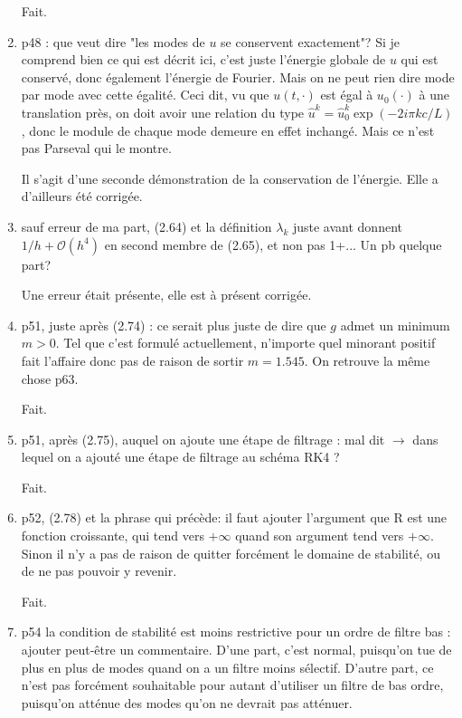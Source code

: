 \documentclass[10pt,a4paper]{article}
\begin{document}
\begin{enumerate}
{\color{blue} Fait.} 


\item p48 : que veut dire "les modes de $u$ se conservent exactement"? Si je comprend bien ce qui est décrit ici, c'est juste l'énergie globale de $u$ qui est conservé, donc également l'énergie de Fourier. Mais on ne peut rien dire mode par mode avec cette égalité. Ceci dit, vu que $u(t,\cdot)$ est égal à $u_0(\cdot)$ à une translation près, on doit avoir une relation du type $\hat{u}^k = \hat{u}^k_0 \exp (-2i \pi k c /L)$, donc le module de chaque mode demeure en effet inchangé. Mais ce n'est pas Parseval qui le montre.

{\color{blue} Il s'agit d'une seconde démonstration de la conservation de l'énergie. Elle a d'ailleurs été corrigée.} 


\item sauf erreur de ma part, (2.64) et la définition $\lambda_k$ juste avant donnent $1/h + \mathcal{O}(h^4)$ en second membre de (2.65), et non pas 1+... Un pb quelque part?

{\color{blue} Une erreur était présente, elle est à présent corrigée.} 


\item p51, juste après (2.74) : ce serait plus juste de dire que $g$ admet un minimum $m>0$. Tel que c'est formulé actuellement, n'importe quel minorant positif fait l'affaire donc pas de raison de sortir $m=1.545$. On retrouve la même chose p63.

{\color{blue} Fait.} 


\item p51, après (2.75), auquel on ajoute une étape de filtrage : mal dit $\rightarrow$ dans lequel on a ajouté une étape de filtrage au schéma RK4 ?

{\color{blue} Fait.} 


\item p52, (2.78) et la phrase qui précède: il faut ajouter l’argument que R est une fonction
croissante, qui tend vers $+\infty$ quand son argument tend vers $+\infty$. Sinon il n’y a pas
de raison de quitter forcément le domaine de stabilité, ou de ne pas pouvoir y revenir.

{\color{blue} Fait.} 


\item p54 la condition de stabilité est moins restrictive pour un ordre de filtre bas : ajouter
peut-être un commentaire. D’une part, c’est normal, puisqu’on tue de plus en plus
de modes quand on a un filtre moins sélectif. D’autre part, ce n’est pas forcément
souhaitable pour autant d’utiliser un filtre de bas ordre, puisqu’on atténue des modes
qu’on ne devrait pas atténuer.


\end{enumerate}
\end{document}
